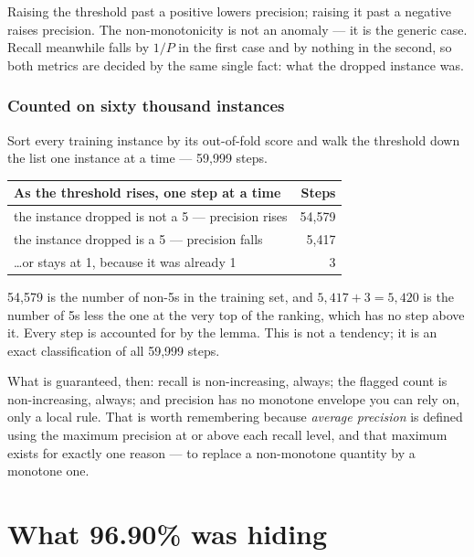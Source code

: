 \documentclass[11pt,a4paper]{article}
\begin{document}
\begin{keybox}[title={The whole result in one sentence}]
Raising the threshold past a positive lowers precision; raising it past a
negative raises precision. The non-monotonicity is not an anomaly --- it is the
generic case. Recall meanwhile falls by $1/P$ in the first case and by nothing
in the second, so both metrics are decided by the same single fact: what the
dropped instance was.
\end{keybox}

\subsubsection{Counted on sixty thousand instances}

Sort every training instance by its out-of-fold score and walk the threshold
down the list one instance at a time --- 59{,}999 steps.

\begin{center}
\small
\begin{tabular}{lr}
\toprule
\textbf{As the threshold rises, one step at a time} & \textbf{Steps} \\
\midrule
the instance dropped is not a 5 --- precision rises & 54{,}579 \\
the instance dropped is a 5 --- precision falls     &  5{,}417 \\
\ldots or stays at 1, because it was already 1      &      3 \\
\bottomrule
\end{tabular}
\end{center}

54{,}579 is the number of non-5s in the training set, and $5{,}417 + 3 =
5{,}420$ is the number of 5s less the one at the very top of the ranking, which
has no step above it. Every step is accounted for by the lemma. This is not a
tendency; it is an exact classification of all 59{,}999 steps.

What is guaranteed, then: recall is non-increasing, always; the flagged count
is non-increasing, always; and precision has no monotone envelope you can rely
on, only a local rule. That is worth remembering because \emph{average
precision} is defined using the maximum precision at or above each recall
level, and that maximum exists for exactly one reason --- to replace a
non-monotone quantity by a monotone one.

\section{What 96.90\% was hiding}
\end{document}

